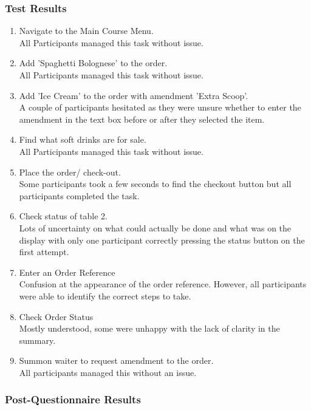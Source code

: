 \documentclass[11pt, a4paper]{report}
\begin{document}
\subsubsection{Test Results} 
\begin{enumerate} 
\item Navigate to the Main Course Menu. \\
All Participants managed this task without issue.
\item Add 'Spaghetti Bolognese' to the order. \\ 
All Participants managed this task without issue.
\item Add 'Ice Cream' to the order with amendment 'Extra Scoop'. \\ 
A couple of participants hesitated as they were unsure whether to enter the amendment in the text box before or after they selected the item.
\item Find what soft drinks are for sale.\\
All Participants managed this task without issue.
\item Place the order/ check-out.\\ 
Some participants took a few seconds to find the checkout button but all participants completed the task.
\item Check status of table 2.\\
Lots of uncertainty on what could actually be done and what was on the display with only one participant correctly pressing the status button on the first attempt.
\item Enter an Order Reference \\
Confusion at the appearance of the order reference. However, all participants were able to identify the correct steps to take.
\item Check Order Status \\
Mostly understood, some were unhappy with the lack of clarity in the summary.
\item Summon waiter to request amendment to the order.\\
All participants managed this without an issue. 
\end{enumerate} 


\subsubsection{Post-Questionnaire Results} 
\end{document}
